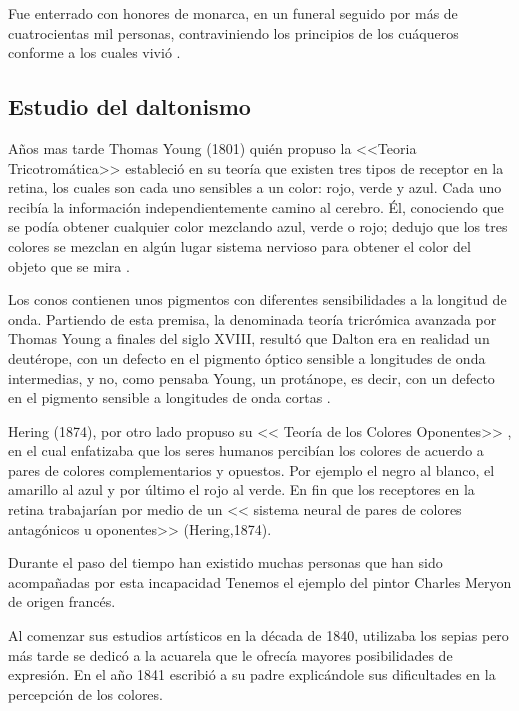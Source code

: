 \documentclass[10pt]{article}
\begin{document}
\setlength{\parskip}{2mm}

Fue enterrado con honores de monarca, en un funeral seguido por más de cuatrocientas mil personas, contraviniendo los principios de los cuáqueros conforme a los cuales vivió \cite{IEEEreferencias:Ref1}. 

\subsection{Estudio del daltonismo}

Años mas tarde Thomas Young (1801) quién propuso la <<Teoria Tricotromática>> estableció en su teoría que existen tres tipos de receptor en la retina, los cuales son cada uno sensibles a un color: rojo, verde y azul. Cada uno recibía la información independientemente camino al cerebro. Él, conociendo que se podía obtener cualquier color mezclando azul, verde o rojo; dedujo que los tres colores se mezclan en algún lugar sistema nervioso para obtener el color del objeto que se mira \cite{IEEEreferencias:Ref4}.

\setlength{\parskip}{2mm}

Los conos contienen unos pigmentos con diferentes sensibilidades a la longitud de onda. Partiendo de esta premisa, la denominada teoría tricrómica avanzada por Thomas Young a finales del siglo XVIII, resultó que Dalton era en realidad un deutérope, con un defecto en el pigmento óptico sensible a longitudes de onda intermedias, y no, como pensaba Young, un protánope, es decir, con un defecto en el pigmento sensible a longitudes de onda cortas \cite{IEEEreferencias:Ref3}.

\setlength{\parskip}{2mm}

Hering (1874), por otro lado propuso su << Teoría de los Colores Oponentes>> , en el cual enfatizaba que los seres humanos percibían los colores de acuerdo a pares de colores complementarios y opuestos. Por ejemplo el negro al blanco, el amarillo al azul y por último el rojo al verde. En fin que los receptores en la retina trabajarían por medio de un << sistema neural de pares de colores antagónicos u oponentes>> (Hering,1874)\cite{IEEEreferencias:Ref4}.

\setlength{\parskip}{2mm}

Durante el paso del tiempo han existido muchas personas que han sido acompañadas por esta incapacidad 
Tenemos el ejemplo del pintor Charles Meryon de origen francés.

\setlength{\parskip}{2mm}

Al comenzar sus estudios artísticos en la década de 1840, utilizaba los sepias pero más tarde se dedicó a la acuarela que le ofrecía mayores posibilidades de expresión. En el año 1841 escribió a su padre explicándole sus dificultades en la percepción de los colores.
\end{document}
